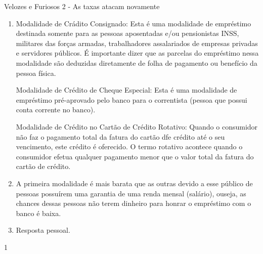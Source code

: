 \begin{resposta}{Velozes e Furiosos 2 - As taxas atacam novamente}
{
  \begin{enumerate}
    \item Modalidade de Crádito Consignado: Esta é uma modalidade de empréstimo destinada somente para as pessoas aposentadas e/ou pensionistas INSS, militares das forças armadas, trabalhadores assalariados de empresas privadas e servidores públicos. É importante dizer que as parcelas do empréstimo nessa modalidade são deduzidas diretamente de folha de pagamento ou benefício da pessoa física.

    Modalidade de Crédito de Cheque Especial: Esta é uma modalidade de empréstimo pré-aprovado pelo banco para o correntista (pessoa que possui conta corrente no banco).

    Modalidade de Crédito no Cartão de Crédito Rotativo: Quando o consumidor não faz o pagamento total da fatura do cartão dfe crédito até o seu vencimento, este crédito é oferecido. O termo rotativo acontece quando o consumidor efetua qualquer pagamento menor que o valor total da fatura do cartão de crédito.

    \item A primeira modalidade é mais barata que as outras devido a esse público de pessoas possuírem uma garantia de uma renda mensal (salário), ouseja, as chances dessas pessoas não terem dinheiro para honrar o empréstimo com o banco é baixa.

    \item Resposta pessoal.
  \end{enumerate}
}{1}
\end{resposta}

